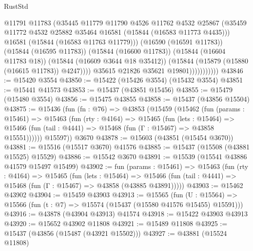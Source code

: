\begin{lexlean}{RustStd}
\begin{coremodule}
                              @11791
                              @11783
                              (@35445
                                @11779
                                @11790
                                @4526
                                @11762
                                @4532
                                @25867
                                (@35459
                                  @11772
                                  @4532
                                  @25882
                                  @35464
                                  @16581
                                  (@15844 (@16583 @11773 @4435)))
                                @16581
                                (@15844 (@16583 @11763 @11779)))
                              (@16590 (@16591 @11783))
                              (@15844 (@16595 @11783))
                              (@15844 (@16600 @11783))
                              (@15844 (@16604 @11783 @18))
                              (@15844 (@16609 @3644 @18 @35412))
                              (@15844 (@15879 (@15880 (@16615 @11783)) @4247))))
                          @35615
                          @21826
                          @35621
                          @19801)))))))))))
@43846 := @15420 @3554
@43850 := @15422 (@15426 @3554) (@15432 @3554)
@43851 := @15441 @41573
@43853 := @15437 (@43851 @15456)
@43855 := @15479 (@15480 @3554)
@43856 := @15475 @43855
@43858 := @15437 (@43856 @15504)
@43875 := @15436
    (fun (fn : @76) =>
    @43853
      (@15459
        (@15462
          (fun (params : @15461) =>
          @15463
            (fun (rty : @4164) =>
            @15465
              (fun (lets : @15464) =>
              @15466 (fun (tail : @4441) => @15468 (fun (Γ : @15467) => @43858 @15551))))))
        @15597))
    @3670
@43878 := @15603 (@43851 (@15454 @3670))
@43881 := @15516 (@15517 @3670) @41576
@43885 := @15437 (@15508 (@43881 @15525) @15529)
@43886 := @15542 @3670
@43891 := @15539 (@15541 @43886 @41579 @15497 @15499)
@43902 := fun (params : @15461) =>
  @15463
    (fun (rty : @4164) =>
    @15465
      (fun (lets : @15464) =>
      @15466 (fun (tail : @4441) => @15468 (fun (Γ : @15467) => @43858 (@43885 @43891)))))
@43903 := @15462 @43902
@43904 := @15459 @43903
@43913 := @15565
    (fun (U : @15564) => @15566 (fun (t : @7) => @15574 (@15437 (@15580 @41576 @15455) @15591)))
@43916 := @43878 (@43904 @43913) @41574
@43918 := @15422 @43903 @43913
@43920 := @15652 @43902 @11808
@43921 := @15489 @11808
@43925 := @15437 (@43856 (@15487 (@43921 @15502)))
@43927 := @43881 (@15524 @11808)

\end{coremodule}
\end{lexlean}
